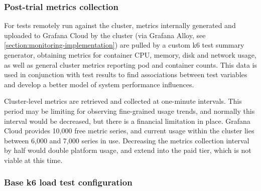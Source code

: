 \subsubsection{Post-trial metrics collection}

For tests remotely run against the cluster, metrics internally generated and uploaded to Grafana Cloud by the cluster (via Grafana Alloy, see \ref{section:monitoring-implementation}) are pulled by a custom k6 test summary generator, obtaining metrics for container CPU, memory, disk and network usage, as well as general cluster metrics reporting pod and container counts. This data is used in conjunction with test results to find associations between test variables and develop a better model of system performance influences.

Cluster-level metrics are retrieved and collected at one-minute intervals. This period may be limiting for observing fine-grained usage trends, and normally this interval would be decreased, but there is a financial limitation in place. Grafana Cloud provides 10,000 free metric series, and current usage within the cluster lies between 6,000 and 7,000 series in use. Decreasing the metrics collection interval by half would double platform usage, and extend into the paid tier, which is not viable at this time.

\subsubsection{Base k6 load test configuration}

